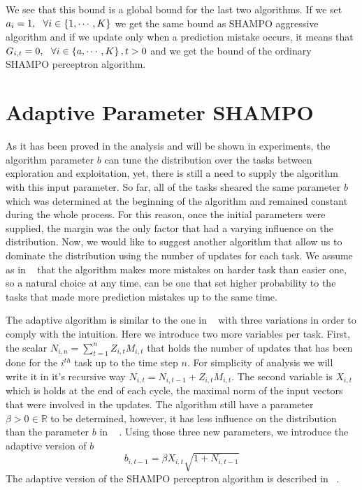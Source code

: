 {\noindent
We see that this  bound is a global bound for the last two algorithms. 
If we set $a_i=1, ~~\forall i\in\left\{{1,\cdots,K}\right\}$ we get the same bound as  SHAMPO aggressive 
algorithm and if we update only when a prediction mistake occurs, it means that 
$G_{i,t}=0,~~\forall i\in\left\{{a,\cdots,K}\right\},t>0$ and we get the bound of  the ordinary 
SHAMPO perceptron algorithm.


\section{Adaptive Parameter SHAMPO}\label{sec:adaptive}

As it has been proved in the analysis and will be shown in experiments, the algorithm parameter $b$ can tune 
the distribution over the tasks between exploration and exploitation, yet, there is still a need to supply 
the algorithm with this input parameter. So far, all of the tasks sheared the same parameter $b$ which
was determined at the beginning of the algorithm and remained constant during the whole process. 
For this reason, once the initial parameters were supplied, the margin was the only factor that had a varying
influence on the distribution. Now, we would like to suggest another algorithm that allow us to
dominate the distribution using the number of updates for each task. 
We assume as in ~\cite{cesa2006worst} that the algorithm makes more mistakes on harder task than easier one, so a natural choice 
at any time, can be one that set higher probability to the tasks that made more prediction mistakes up to 
the same time. 

The adaptive algorithm is similar to the one in ~ with three variations in order to 
comply with the intuition. Here we introduce two more variables per task. First, the scalar 
$N_{i,n} = \sum_{t=1}^n{Z_{i,t}M_{i,t}}$ that holds the number of updates that has been done for the 
$i^{th}$ task  up to the time step $n$.
For simplicity of analysis we will write it in it's recursive way $N_{i,t}=N_{i,t-1}+Z_{i,t}M_{i,t}$.
The second variable is $X_{i,t}$ which is holds at the end of each cycle,  
the maximal norm of the input vectors that were involved in the updates.  
The algorithm still have a parameter $\beta>0 \in\mathbb{R}$ to be 
determined, however, it has less influence on the distribution than the parameter $b$ in ~ .
Using those three new parameters, we introduce the adaptive version of $b$
\[
b_{i,t-1}=\beta X_{i,t} \sqrt{1+N_{i,t-1}}
\]
 The adaptive version of the  SHAMPO perceptron algorithm is  described in ~. 

}
